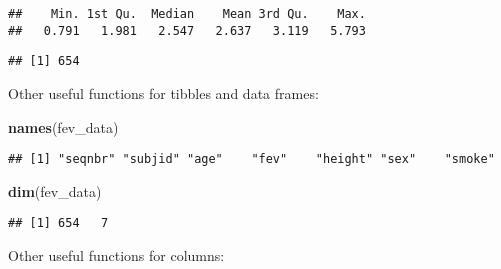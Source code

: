 \documentclass[
]{article}
\newenvironment{Shaded}{\begin{snugshade}}{\end{snugshade}}
\newcommand{\FunctionTok}[1]{\textcolor[rgb]{0.13,0.29,0.53}{\textbf{#1}}}
\newcommand{\NormalTok}[1]{#1}
\newcommand{\SpecialCharTok}[1]{\textcolor[rgb]{0.81,0.36,0.00}{\textbf{#1}}}
\begin{document}
\begin{Shaded}
\end{Shaded}

\begin{verbatim}
##    Min. 1st Qu.  Median    Mean 3rd Qu.    Max. 
##   0.791   1.981   2.547   2.637   3.119   5.793
\end{verbatim}

\begin{Shaded}
\end{Shaded}

\begin{verbatim}
## [1] 654
\end{verbatim}

Other useful functions for tibbles and data frames:

\begin{Shaded}
\begin{Highlighting}[]
\FunctionTok{names}\NormalTok{(fev\_data)}
\end{Highlighting}
\end{Shaded}

\begin{verbatim}
## [1] "seqnbr" "subjid" "age"    "fev"    "height" "sex"    "smoke"
\end{verbatim}

\begin{Shaded}
\begin{Highlighting}[]
\FunctionTok{dim}\NormalTok{(fev\_data)}
\end{Highlighting}
\end{Shaded}

\begin{verbatim}
## [1] 654   7
\end{verbatim}

Other useful functions for columns:

\begin{Shaded}
\end{Shaded}
\end{document}
